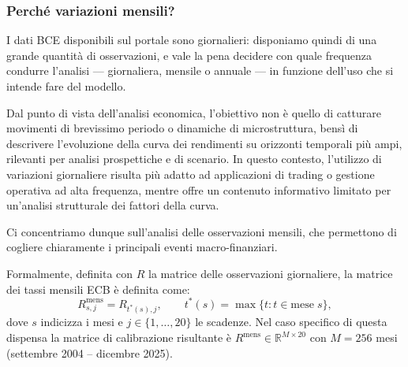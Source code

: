 \documentclass[11pt,a4paper]{article}
\theoremstyle{plain}
\theoremstyle{definition}
\theoremstyle{remark}
\begin{document}
\subsubsection{Perché variazioni mensili?}
\label{sec:motivazione-mensile}


I dati BCE disponibili sul portale sono giornalieri: disponiamo quindi di una
grande quantità di osservazioni, e vale la pena decidere con quale frequenza
condurre l'analisi --- giornaliera, mensile o annuale --- in funzione dell'uso
che si intende fare del modello.

Dal punto di vista dell'analisi economica, l'obiettivo non è quello di catturare movimenti
di brevissimo periodo o dinamiche di microstruttura, bensì di descrivere l'evoluzione della
curva dei rendimenti su orizzonti temporali più ampi, rilevanti per analisi prospettiche e
di scenario. In questo contesto, l'utilizzo di variazioni giornaliere risulta più adatto ad
applicazioni di trading o gestione operativa ad alta frequenza, mentre offre un contenuto
informativo limitato per un'analisi strutturale dei fattori della curva.

Ci concentriamo dunque sull'analisi delle osservazioni mensili, che permettono di cogliere chiaramente i principali eventi
macro-finanziari. %


Formalmente, definita con $R$ la matrice delle osservazioni giornaliere, 
la matrice dei tassi mensili ECB è definita come:
\[
R^{\text{mens}}_{s,j} = R_{t^*(s),j}, \qquad
t^*(s) = \max\{t : t \in \text{mese}\; s\},
\]
dove $s$ indicizza i mesi e $j \in \{1,\ldots,20\}$ le scadenze.
Nel caso specifico di questa dispensa la matrice di calibrazione
risultante è $R^{\text{mens}} \in \mathbb{R}^{M \times 20}$ con $M = 256$
mesi (settembre 2004 -- dicembre 2025). %
\end{document}

